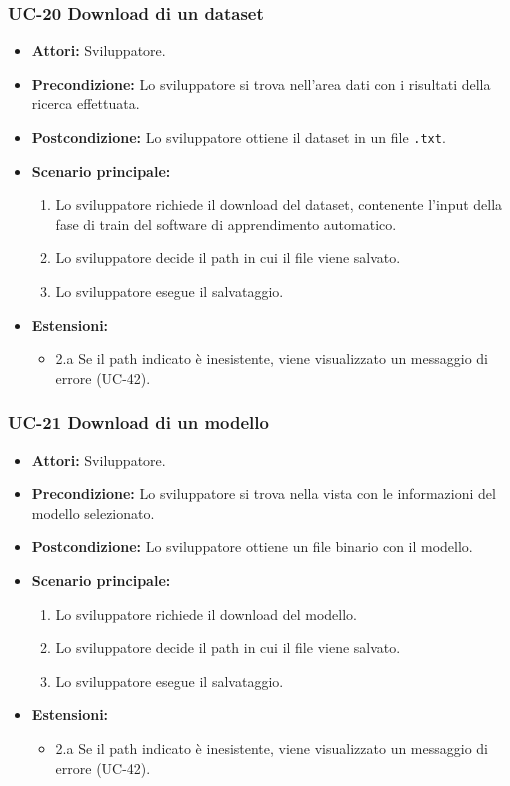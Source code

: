 	\subsubsection{UC-20 Download di un dataset}
		\begin{itemize}
			\item \textbf{Attori:} Sviluppatore.
			\item \textbf{Precondizione:} Lo sviluppatore si trova nell'area dati con i risultati della ricerca effettuata.
			\item \textbf{Postcondizione:} Lo sviluppatore ottiene il dataset in un file \texttt{.txt}.
			\item \textbf{Scenario principale:}
			\begin{enumerate}
				\item Lo sviluppatore richiede il download del dataset, contenente l'input della fase di train del software di apprendimento automatico.
				\item Lo sviluppatore decide il path in cui il file viene salvato.
				\item Lo sviluppatore esegue il salvataggio.
			\end{enumerate}
			\item \textbf{Estensioni:}
				\begin{itemize}
					\item 2.a Se il path indicato è inesistente, viene visualizzato un messaggio di errore (UC-42).
				\end{itemize}
		\end{itemize}
	
	\subsubsection{UC-21 Download di un modello}
		\begin{itemize}
			\item \textbf{Attori:} Sviluppatore.
			\item \textbf{Precondizione:} Lo sviluppatore si trova nella vista con le informazioni del modello selezionato.
			\item \textbf{Postcondizione:} Lo sviluppatore ottiene un file binario con il modello.
			\item \textbf{Scenario principale:}
			\begin{enumerate}
					\item Lo sviluppatore richiede il download del modello.
					\item Lo sviluppatore decide il path in cui il file viene salvato.
					\item Lo sviluppatore esegue il salvataggio.
				\end{enumerate}
			\item \textbf{Estensioni:}
				\begin{itemize}
					\item 2.a Se il path indicato è inesistente, viene visualizzato un messaggio di errore (UC-42).
				\end{itemize}
		\end{itemize}	
		

